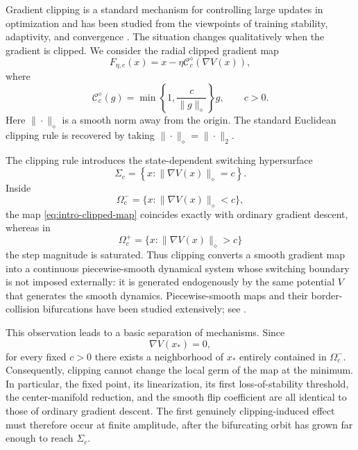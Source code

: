 Gradient clipping is a standard mechanism for controlling large
updates in optimization and has been studied from the viewpoints of
training stability, adaptivity, and convergence
\cite{PascanuMikolovBengio2013,ZhangEtAl2020,KoloskovaHendrikxStich2023,Goodfellow2016}.
The situation changes qualitatively when the gradient is clipped.
We consider the radial clipped gradient map
\begin{equation}
F_{\eta,c}(x)
=
x-\eta\mathcal C_c^\diamond(\nabla V(x)),
\label{eq:intro-clipped-map}
\end{equation}
where
\begin{equation}
\mathcal C_c^\diamond(g)
=
\min
\left\{
1,\frac{c}{\|g\|_\diamond}
\right\}g,
\qquad
c>0.
\label{eq:intro-clipping}
\end{equation}
Here $\|\cdot\|_\diamond$ is a smooth norm away from the origin.
The standard Euclidean clipping rule is recovered by taking
$\|\cdot\|_\diamond=\|\cdot\|_2$.

The clipping rule introduces the state-dependent switching
hypersurface
\begin{equation}
\Sigma_c
=
\left\{
x:
\|\nabla V(x)\|_\diamond=c
\right\}.
\label{eq:intro-switching-surface}
\end{equation}
Inside
\[
\Omega_c^-
=
\{x:\|\nabla V(x)\|_\diamond<c\},
\]
the map \eqref{eq:intro-clipped-map} coincides exactly with ordinary
gradient descent, whereas in
\[
\Omega_c^+
=
\{x:\|\nabla V(x)\|_\diamond>c\}
\]
the step magnitude is saturated.  Thus clipping converts a smooth
gradient map into a continuous piecewise-smooth dynamical system whose
switching boundary is not imposed externally: it is generated
endogenously by the same potential $V$ that generates the smooth
dynamics.  Piecewise-smooth maps and their border-collision
bifurcations have been studied extensively; see
\cite{Filippov1988,NusseYorke1992,diBernardo2008,diBernardoEtAl2008,
diBernardoHogan2010,Simpson2010,Simpson2016,LeineNijmeijer2004}.

This observation leads to a basic separation of mechanisms.  Since
\[
\nabla V(x_*)=0,
\]
for every fixed $c>0$ there exists a neighborhood of $x_*$ entirely
contained in $\Omega_c^-$.  Consequently, clipping cannot change the
local germ of the map at the minimum.  In particular, the fixed point,
its linearization, its first loss-of-stability threshold, the
center-manifold reduction, and the smooth flip coefficient are all
identical to those of ordinary gradient descent.  The first genuinely
clipping-induced effect must therefore occur at finite amplitude,
after the bifurcating orbit has grown far enough to reach
$\Sigma_c$.

